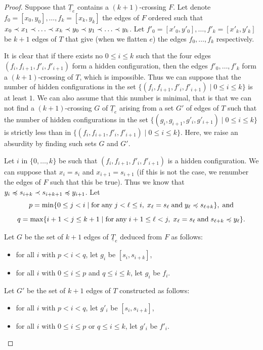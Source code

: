 \documentclass[12pt]{amsart}
\begin{document}
\begin{proof}
Suppose that $\underline{T}_e$ contains a $(k+1)$-crossing $F$. Let denote $f_0=[x_0,y_0],\ldots,f_k=[x_k,y_k]$ the edges of $F$ ordered such that $x_0\prec x_1\prec\ldots\prec x_k\prec y_0\prec y_1\prec \ldots\prec y_k$. Let $f'_0=[x'_0,y'_0],\ldots,f'_k=[x'_k,y'_k]$ be $k+1$ edges of $T$ that give (when we flatten $e$) the edges $f_0,\ldots,f_k$ respectively.

It is clear that if there exists no $0\le i\le k$ such that the four edges $(f_i,f_{i+1},f'_i,f'_{i+1})$ form a hidden configuration, then the edges $f'_0,\ldots,f'_k$ form a $(k+1)$-crossing of $T$, which is impossible. Thus we can suppose that the number of hidden configurations in the set $\{(f_i,f_{i+1},f'_i,f'_{i+1})\;|\; 0\le i\le k\}$ is at least $1$. We can also assume that this number is minimal, that is that we can not find a $(k+1)$-crossing $G$ of $\underline{T}_e$ arising from a set $G'$ of edges of $T$ such that the number of hidden configurations in the set $\{(g_i,g_{i+1},g'_i,g'_{i+1})\;|\; 0\le i\le k\}$ is strictly less than in $\{(f_i,f_{i+1},f'_i,f'_{i+1})\;|\; 0\le i\le k\}$. Here, we raise an absurdity by finding such sets $G$ and $G'$.

Let $i$ in $\{0,\ldots,k\}$ be such that $(f_i,f_{i+1},f'_i,f'_{i+1})$ is a hidden configuration. We can suppose that $x_i=s_i$ and $x_{i+1}=s_{i+1}$ (if this is not the case, we renumber the edges of $F$ such that this be true). Thus we know that $y_i\preccurlyeq s_{i+k}\prec s_{i+k+1}\preccurlyeq y_{i+1}$. Let 
$$p=\min\{0\le j< i \;|\; \mathrm{for\; any}\; j< \ell\le i, \; x_\ell=s_\ell\;\mathrm{and}\;  y_\ell\preccurlyeq s_{\ell+k}\}, \;\mathrm{and}$$
$$q=\max\{i+1<j\le k+1 \;|\; \mathrm{for\; any}\; i+1\le \ell< j, \; x_\ell=s_\ell\;\mathrm{and}\;  s_{\ell+k}\preccurlyeq y_\ell\}.$$

Let $G$ be the set of $k+1$ edges of $\underline{T}_e$ deduced from $F$ as follows:
\begin{itemize}
\item for all $i$ with $p<i<q$, let $g_i$ be $[s_i,s_{i+k}]$,
\item for all $i$ with $0\le i\le p$ and $q\le i\le k$, let $g_i$ be $f_i$.
\end{itemize}
Let $G'$ be the set of $k+1$ edges of $T$ constructed as follows:
\begin{itemize}
\item for all $i$ with $p<i<q$, let $g'_i$ be $[s_i,s_{i+k}]$,
\item for all $i$ with $0\le i\le p$ or $q\le i\le k$, let $g'_i$ be $f'_i$.
\end{itemize}
		

\end{proof}
\end{document}
